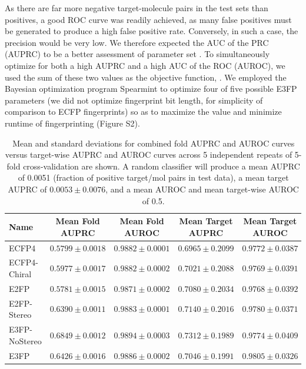 \documentclass[../main.tex]{subfiles}
\begin{document}
\begin{refsection}
As there are far more negative target-molecule pairs in the test sets than positives, a good ROC curve was readily achieved, as many false positives must be generated to produce a high false positive rate.
Conversely, in such a case, the precision would be very low.
We therefore expected the AUC of the PRC (AUPRC) to be a better assessment of parameter set \cite{saito_2015}.
To simultaneously optimize for both a high AUPRC and a high AUC of the ROC (AUROC), we used the sum of these two values as the objective function, \AUCsum{}.
We employed the Bayesian optimization program Spearmint  \cite{snoek_2012} to optimize four of five possible E3FP parameters  (we did not optimize fingerprint bit length, for simplicity of comparison to ECFP fingerprints) so as to maximize the \AUCsum{} value and minimize runtime of fingerprinting  (Figure S2).

\begin{table}
    \centering  \begin{tabular}{lcccc}
        \toprule Name & Mean Fold AUPRC & Mean Fold AUROC & Mean Target AUPRC & Mean Target AUROC \\
        \midrule ECFP4         & $0.5799 \pm 0.0018$ & $0.9882 \pm 0.0001$ & $0.6965 \pm 0.2099$ & $0.9772 \pm 0.0387$\\
        ECFP4-Chiral  & $0.5977 \pm 0.0017$ & $0.9882 \pm 0.0002$ & $0.7021 \pm 0.2088$ & $0.9769 \pm 0.0391$\\
        E2FP          & $0.5781 \pm 0.0015$ & $0.9871 \pm 0.0002$ & $0.7080 \pm 0.2034$ & $0.9768 \pm 0.0392$\\
        E2FP-Stereo   & $0.6390 \pm 0.0011$ & $0.9883 \pm 0.0001$ & $0.7140 \pm 0.2016$ & $0.9780 \pm 0.0371$\\
        E3FP-NoStereo & $0.6849 \pm 0.0012$ & $0.9894 \pm 0.0003$ & $0.7312 \pm 0.1989$ & $0.9774 \pm 0.0409$\\
        E3FP          & $0.6426 \pm 0.0016$ & $0.9886 \pm 0.0002$ & $0.7046 \pm 0.1991$ & $0.9805 \pm 0.0326$\\
    \end{tabular}
    \caption[Mean and standard deviations for combined fold AUPRC and AUROC curves]{
        Mean and standard deviations for combined fold AUPRC and AUROC curves versus target-wise AUPRC and AUROC curves across 5 independent repeats of 5-fold cross-validation are shown.
        A random classifier will produce a mean AUPRC of 0.0051  (fraction of positive target/mol pairs in test data), a mean target AUPRC of $0.0053 \pm 0.0076$, and a mean AUROC and mean target-wise AUROC of 0.5.
    }
    \label{table:table1}
\end{table}


\end{refsection}
\end{document}
